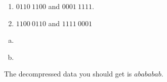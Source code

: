 \begin{Answer}[ref={bit-packing-order}]

  \begin{enumerate}[a]
  \item $0110\ 1100$ and $0001\ 1111$.
  \item $1100 \ 0110$ and $1111 \ 0001$
  \end{enumerate}

\end{Answer}

\begin{Answer}[ref={firstnbits}]

  \begin{enumerate}[(a)]
  \item

    \begin{algorithmic}[1]
      \EndProcedure
    \end{algorithmic}

  \item


    \begin{algorithmic}[1]
      \EndProcedure
    \end{algorithmic}


  \end{enumerate}

\end{Answer}


\begin{Answer}[ref={lzw-decompress}]

  The decompressed data you should get is $abababab$.

\end{Answer}